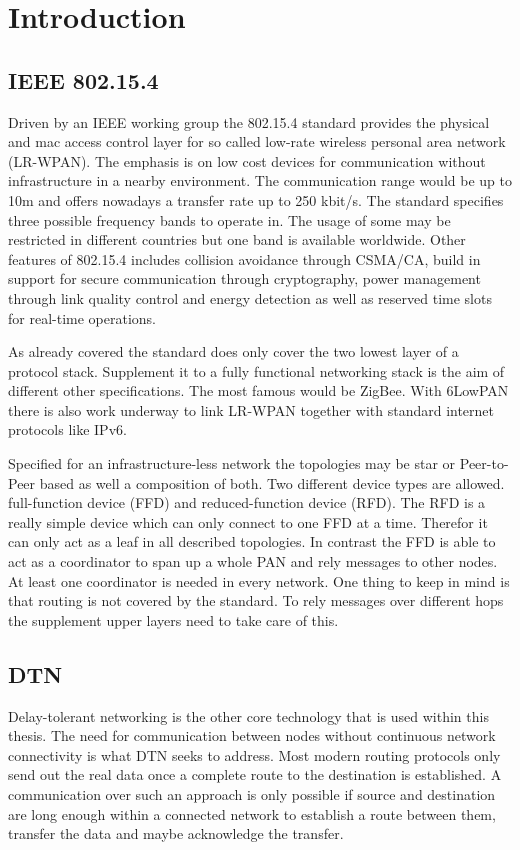 \chapter{Introduction}


\section{IEEE 802.15.4}
\label{intro802154}
Driven by an IEEE working group the 802.15.4 standard provides the physical and
mac access control layer for so called low-rate wireless personal area network
(LR-WPAN). The emphasis is on low cost devices for communication without
infrastructure in a nearby environment. The communication range would be up to
10m and offers nowadays a transfer rate up to 250 kbit/s. The standard specifies
three possible frequency bands to operate in. The usage of some may be
restricted in different countries but one band is available worldwide. Other
features of 802.15.4 includes collision avoidance through CSMA/CA, build in
support for secure communication through cryptography, power management through
link quality control and energy detection as well as reserved time slots for
real-time operations.

As already covered the standard does only cover the two lowest layer of a
protocol stack. Supplement it to a fully functional networking stack is the aim
of different other specifications. The most famous would be ZigBee. With 6LowPAN
there is also work underway to link LR-WPAN together with standard internet
protocols like IPv6.

Specified for an infrastructure-less network the topologies may be star or
Peer-to-Peer based as well a composition of both. Two different device types are
allowed. full-function device (FFD) and reduced-function device (RFD). The RFD
is a really simple device which can only connect to one FFD at a time. Therefor
it can only act as a leaf in all described topologies. In contrast the FFD is
able to act as a coordinator to span up a whole PAN and rely messages to other
nodes. At least one coordinator is needed in every network. One thing to keep in
mind is that routing is not covered by the standard. To rely messages over
different hops the supplement upper layers need to take care of this.

\section{DTN}
\label{introdtn}
Delay-tolerant networking is the other core technology that is used within this
thesis. The need for communication between nodes without continuous network
connectivity is what DTN seeks to address. Most modern routing protocols only
send out the real data once a complete route to the destination is established.
A communication over such an approach is only possible if source and destination
are long enough within a connected network to establish a route between them,
transfer the data and maybe acknowledge the transfer.

